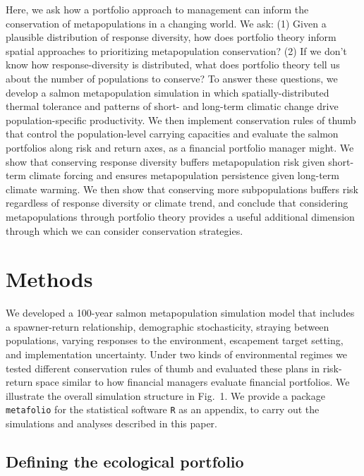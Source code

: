 Here, we ask how a portfolio approach to management can inform the conservation of metapopulations in a changing world. We ask: (1) Given a plausible distribution of response diversity, how does portfolio theory inform spatial approaches to prioritizing metapopulation conservation? (2) If we don't know how response-diversity is distributed, what does portfolio theory tell us about the number of populations to conserve? To answer these questions, we develop a salmon metapopulation simulation in which spatially-distributed thermal tolerance and patterns of short- and long-term climatic change drive population-specific productivity. We then implement conservation rules of thumb that control the population-level carrying capacities and evaluate the salmon portfolios along risk and return axes, as a financial portfolio manager might. We show that conserving response diversity buffers metapopulation risk given short-term climate forcing and ensures metapopulation persistence given long-term climate warming. We then show that conserving more subpopulations buffers risk regardless of response diversity or climate trend, and conclude that considering metapopulations through portfolio theory provides a useful additional dimension through which we can consider conservation strategies.

\section{Methods}

We developed a 100-year salmon metapopulation simulation model that includes a spawner-return relationship, demographic stochasticity, straying between populations, varying responses to the environment, escapement target setting, and implementation uncertainty. Under two kinds of environmental regimes we tested different conservation rules of thumb and evaluated these plans in risk-return space similar to how financial managers evaluate financial portfolios. We illustrate the overall simulation structure in Fig.~1. We provide a package \texttt{metafolio} for the statistical software \texttt{R} \citep{r2013} as an appendix, to carry out the simulations and analyses described in this paper.

\subsection{Defining the ecological portfolio}


